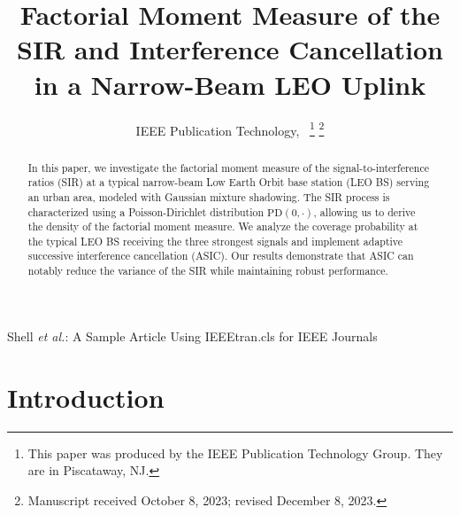 \documentclass[lettersize,journal]{IEEEtran}
\begin{document}
\title{Factorial Moment Measure of the SIR and Interference Cancellation in a Narrow-Beam LEO Uplink}
\author{IEEE Publication Technology,~
\thanks{This paper was produced by the IEEE Publication Technology Group. They are in Piscataway, NJ.}%
\thanks{Manuscript received October 8, 2023; revised December 8, 2023.}}

%
{Shell \MakeLowercase{\textit{et al.}}: A Sample Article Using IEEEtran.cls for IEEE Journals}

\IEEEpubid{}


\maketitle
\begin{abstract}
In this paper, we investigate the factorial moment measure of the signal-to-interference ratios (SIR) at a typical narrow-beam Low Earth Orbit base station (LEO BS) serving an urban area, modeled with Gaussian mixture shadowing. The SIR process is characterized using a Poisson-Dirichlet distribution $\text{PD}(0, \cdot)$, allowing us to derive the density of the factorial moment measure. We analyze the coverage probability at the typical LEO BS receiving the three strongest signals and implement adaptive successive interference cancellation (ASIC). Our results demonstrate that ASIC can notably reduce the variance of the SIR while maintaining robust performance.
\end{abstract}

\begin{IEEEkeywords}
  
\end{IEEEkeywords}


\section{Introduction}
\end{document}
